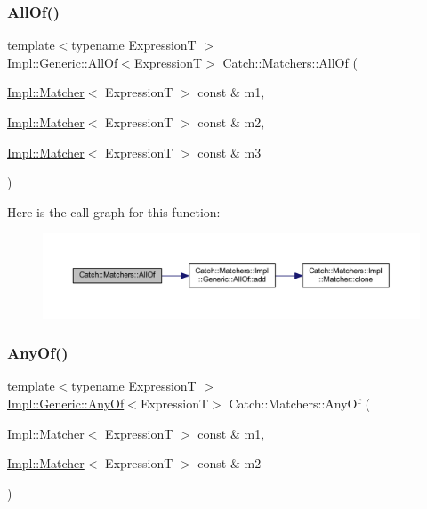 \subsubsection{\texorpdfstring{All\+Of()}{AllOf()}\hspace{0.1cm}{\footnotesize\ttfamily [2/2]}}
{\footnotesize\ttfamily template$<$typename ExpressionT $>$ \\
\hyperlink{class_catch_1_1_matchers_1_1_impl_1_1_generic_1_1_all_of}{Impl\+::\+Generic\+::\+All\+Of}$<$ExpressionT$>$ Catch\+::\+Matchers\+::\+All\+Of (\begin{DoxyParamCaption}\item[{\hyperlink{struct_catch_1_1_matchers_1_1_impl_1_1_matcher}{Impl\+::\+Matcher}$<$ ExpressionT $>$ const \&}]{m1,  }\item[{\hyperlink{struct_catch_1_1_matchers_1_1_impl_1_1_matcher}{Impl\+::\+Matcher}$<$ ExpressionT $>$ const \&}]{m2,  }\item[{\hyperlink{struct_catch_1_1_matchers_1_1_impl_1_1_matcher}{Impl\+::\+Matcher}$<$ ExpressionT $>$ const \&}]{m3 }\end{DoxyParamCaption})\hspace{0.3cm}{\ttfamily [inline]}}

Here is the call graph for this function\+:\nopagebreak
\begin{figure}[H]
\begin{center}
\leavevmode
\includegraphics[width=350pt]{namespace_catch_1_1_matchers_a990366f7d62d10d9752ad7b24230def0_cgraph}
\end{center}
\end{figure}
\hypertarget{namespace_catch_1_1_matchers_a9cb139c71b9e391d5fc017764695bf84}{}\label{namespace_catch_1_1_matchers_a9cb139c71b9e391d5fc017764695bf84} 
\subsubsection{\texorpdfstring{Any\+Of()}{AnyOf()}\hspace{0.1cm}{\footnotesize\ttfamily [1/2]}}
{\footnotesize\ttfamily template$<$typename ExpressionT $>$ \\
\hyperlink{class_catch_1_1_matchers_1_1_impl_1_1_generic_1_1_any_of}{Impl\+::\+Generic\+::\+Any\+Of}$<$ExpressionT$>$ Catch\+::\+Matchers\+::\+Any\+Of (\begin{DoxyParamCaption}\item[{\hyperlink{struct_catch_1_1_matchers_1_1_impl_1_1_matcher}{Impl\+::\+Matcher}$<$ ExpressionT $>$ const \&}]{m1,  }\item[{\hyperlink{struct_catch_1_1_matchers_1_1_impl_1_1_matcher}{Impl\+::\+Matcher}$<$ ExpressionT $>$ const \&}]{m2 }\end{DoxyParamCaption})\hspace{0.3cm}{\ttfamily [inline]}}

